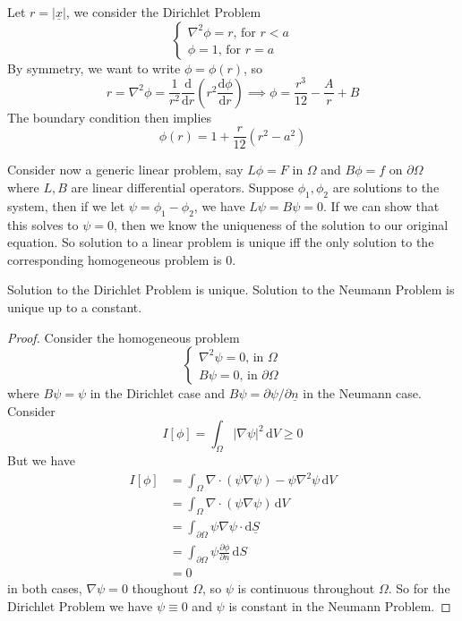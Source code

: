 \begin{example}
    Let $r=|\underline{x}|$, we consider the Dirichlet Problem
    $$\begin{cases}
        \nabla^2\phi=r\text{, for $r<a$}\\
        \phi=1\text{, for $r=a$}
    \end{cases}$$
    By symmetry, we want to write $\phi=\phi(r)$, so
    $$r=\nabla^2\phi=\frac{1}{r^2}\frac{\mathrm d}{\mathrm dr}\left( r^2\frac{\mathrm d\phi}{\mathrm dr} \right)\implies \phi=\frac{r^3}{12}-\frac{A}{r}+B$$
    The boundary condition then implies
    $$\phi(r)=1+\frac{r}{12}(r^2-a^2)$$
\end{example}
Consider now a generic linear problem, say $L\phi=F$ in $\Omega$ and $B\phi=f$ on $\partial\Omega$ where $L,B$ are linear differential operators.
Suppose $\phi_1,\phi_2$ are solutions to the system, then if we let $\psi=\phi_1-\phi_2$, we have $L\psi=B\psi=0$.
If we can show that this solves to $\psi=0$, then we know the uniqueness of the solution to our original equation.
So solution to a linear problem is unique iff the only solution to the corresponding homogeneous problem is $0$.
\begin{proposition}
    Solution to the Dirichlet Problem is unique.
    Solution to the Neumann Problem is unique up to a constant.
\end{proposition}
\begin{proof}
    Consider the homogeneous problem
    $$\begin{cases}
        \nabla^2\psi=0\text{, in $\Omega$}\\
        B\psi=0\text{, in $\partial\Omega$}
    \end{cases}$$
    where $B\psi=\psi$ in the Dirichlet case and $B\psi=\partial\psi/\partial\underline{n}$ in the Neumann case.
    Consider
    $$I[\phi]=\int_\Omega|\nabla\psi|^2\,\mathrm dV\ge 0$$
    But we have
    \begin{align*}
        I[\phi]&=\int_\Omega\nabla\cdot(\psi\nabla\psi)-\psi\nabla^2\psi\,\mathrm dV\\
        &=\int_\Omega\nabla\cdot(\psi\nabla\psi)\,\mathrm dV\\
        &=\int_{\partial\Omega}\psi\nabla\psi\cdot\mathrm d\underline{S}\\
        &=\int_{\partial\Omega}\psi\frac{\partial\phi}{\partial\underline{n}}\,\mathrm dS\\
        &=0
    \end{align*}
    in both cases, $\nabla\psi=0$ thoughout $\Omega$, so $\psi$ is continuous throughout $\Omega$.
    So for the Dirichlet Problem we have $\psi\equiv 0$ and $\psi$ is constant in the Neumann Problem.
\end{proof}
